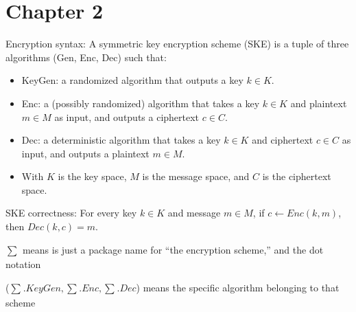 \documentclass[12pt, a4paper, oneside]{report}
\begin{document}
\section{Chapter 2}
Encryption syntax: A symmetric key encryption scheme (SKE) is a tuple of three algorithms (Gen, Enc, Dec) such that:
\begin{itemize}
    \item KeyGen: a randomized algorithm that outputs a key $k \in K$.
    \item Enc: a (possibly randomized) algorithm that takes a key $k \in K$ and plaintext $m \in M$ as input, and outputs a ciphertext $c \in C$.
    \item Dec: a deterministic algorithm that takes a key $k \in K$ and ciphertext $c \in C$ as input, and outputs a plaintext $m \in M$.
    \item With $K$ is the key space, $M$ is the message space, and $C$ is the ciphertext space.
\end{itemize}

SKE correctness: For every key $k \in K$ and message $m \in M$, if $c \leftarrow Enc(k, m)$, then $Dec(k, c) = m$.

$\sum_{}^{}$ means is just a package name for “the encryption scheme,” and the dot notation 

($\sum_{}^{}.KeyGen, \sum_{}^{}.Enc, \sum_{}^{}.Dec$) means the specific algorithm belonging to that scheme
\end{document}
